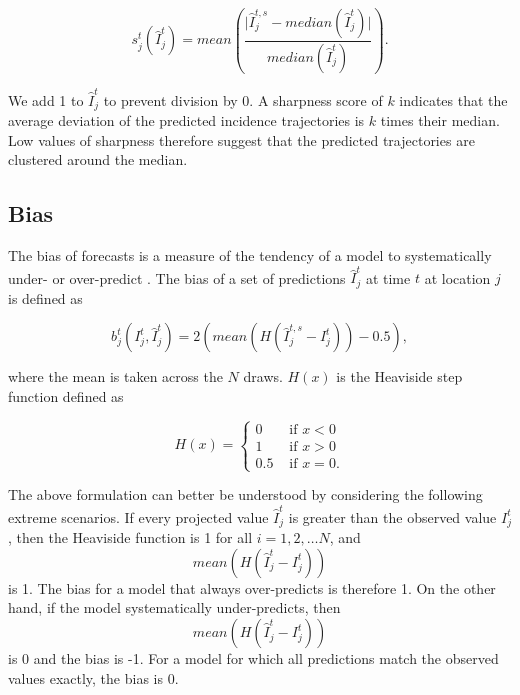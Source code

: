 \documentclass[9pt,twocolumn,twoside,lineno]{pnas-new}
\begin{document}
{\begin{equation*}
s_{j}^{t}(\hat{I}_{j}^{t}) = 
mean 
\left(
\frac{\lvert \hat{I}_{j}^{t, s} - median(\hat{I}_{j}^{t}) \rvert} 
{median(\hat{I}_{j}^{t})} 
\right).
\end{equation*}

We add 1 to \(\hat{I}_{j}^{t}\) to prevent division by 0. A sharpness
score of \(k\) indicates that the average deviation of the predicted
incidence trajectories is \(k\) times their median. Low values of
sharpness therefore suggest that the predicted trajectories are
clustered around the median.


\subsection*{Bias}\label{bias}

The bias of forecasts is a measure of the tendency of a model to
systematically under- or over-predict \cite{funk2017assessing}. The bias
of a set of predictions $\hat{I}_{j}^{t}$ at time \(t\) at
location \(j\) is defined as

\begin{equation*}
b_{j}^{t}(I_{j}^{t}, \hat{I}_{j}^{t}) = 
2 \left( mean \left( H \left (\hat{I}_{j}^{t, s} - I_{j}^{t} \right)
\right) - 0.5 \right),
\end{equation*}

where the mean is taken across the \(N\) draws. \(H(x)\) is the Heaviside
step function defined as

\begin{equation*}
H(x) = \begin{cases} 
0 & \text{ if } x < 0 \\ 
1 & \text{ if } x > 0 \\
0.5 & \text{ if } x = 0. 
\end{cases} 
\end{equation*}

The above formulation can better be understood by considering the
following extreme scenarios. If every projected value
$\hat{I}_{j}^{t}$ is greater than the observed value
$I_{j}^{t}$, then the Heaviside function is 1 for all $i = 1, 2,
\dots N$, and 
\[ mean\left( H \left( \hat{I}_{j}^{t} - I_j^t \right) \right) \]
is 1. The bias for a model that always over-predicts
is therefore 1. On the other hand, if the model systematically
under-predicts, then
\[ mean\left( H \left( \hat{I}_{j}^{t} - I_j^t \right) \right) \]
is 0 and the bias is -1. For a model for which all
predictions match the observed values exactly, the bias is 0.


}
\end{document}
